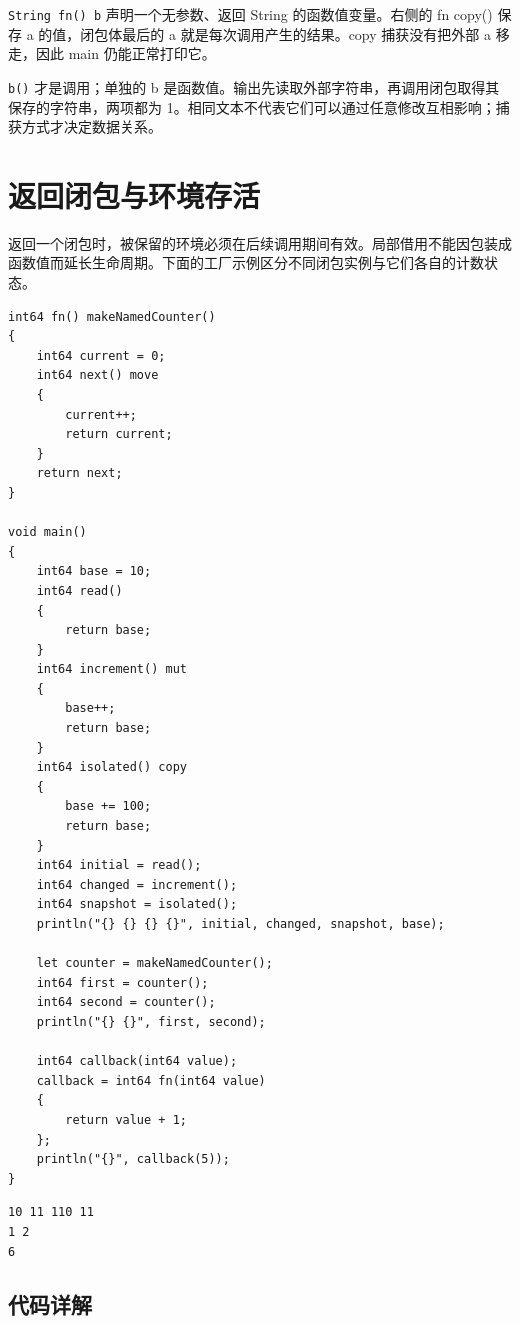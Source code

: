 \texttt{String fn(\allowbreak{})\allowbreak{} b} 声明一个无参数、返回 String 的函数值变量。右侧的 fn copy() 保存 a 的值，闭包体最后的 a 就是每次调用产生的结果。copy 捕获没有把外部 a 移走，因此 main 仍能正常打印它。

\texttt{b(\allowbreak{})\allowbreak{}} 才是调用；单独的 b 是函数值。输出先读取外部字符串，再调用闭包取得其保存的字符串，两项都为 1。相同文本不代表它们可以通过任意修改互相影响；捕获方式才决定数据关系。

\section{返回闭包与环境存活}

返回一个闭包时，被保留的环境必须在后续调用期间有效。局部借用不能因包装成函数值而延长生命周期。下面的工厂示例区分不同闭包实例与它们各自的计数状态。

\par
\medskip
\begin{lstlisting}[style=chali]
int64 fn() makeNamedCounter()
{
    int64 current = 0;
    int64 next() move
    {
        current++;
        return current;
    }
    return next;
}

void main()
{
    int64 base = 10;
    int64 read()
    {
        return base;
    }
    int64 increment() mut
    {
        base++;
        return base;
    }
    int64 isolated() copy
    {
        base += 100;
        return base;
    }
    int64 initial = read();
    int64 changed = increment();
    int64 snapshot = isolated();
    println("{} {} {} {}", initial, changed, snapshot, base);

    let counter = makeNamedCounter();
    int64 first = counter();
    int64 second = counter();
    println("{} {}", first, second);

    int64 callback(int64 value);
    callback = int64 fn(int64 value)
    {
        return value + 1;
    };
    println("{}", callback(5));
}
\end{lstlisting}
\par
\medskip

\par
\medskip
\begin{lstlisting}[style=out]
10 11 110 11
1 2
6
\end{lstlisting}
\par
\medskip

\subsection*{代码详解}

